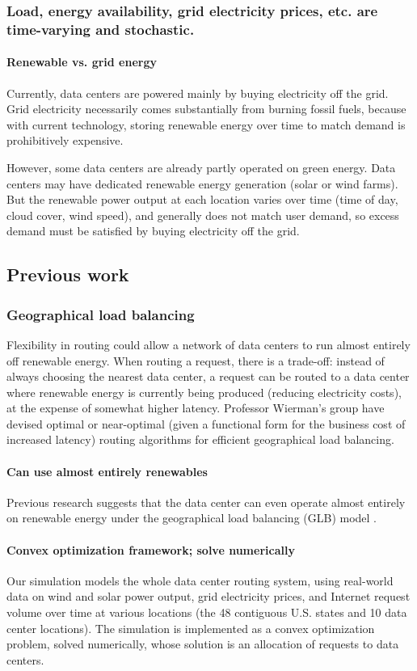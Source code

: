 \documentclass{acm_proc_article-sp}
\begin{document}
	\subsubsection{Load, energy availability, grid electricity prices, etc. are time-varying and stochastic.}
		\paragraph{Renewable vs. grid energy}
			Currently, data centers are powered mainly by buying electricity off the grid. Grid electricity necessarily comes substantially from burning fossil fuels, because with current technology, storing renewable energy over time to match demand is prohibitively expensive.
			
			However, some data centers are already partly operated on green energy. Data centers may have dedicated renewable energy generation (solar or wind farms). But the renewable power output at each location varies over time (time of day, cloud cover, wind speed), and generally does not match user demand, so excess demand must be satisfied by buying electricity off the grid.


\subsection{Previous work}
	\subsubsection{Geographical load balancing}
		Flexibility in routing could allow a network of data centers to run almost entirely off renewable energy. When routing a request, there is a trade-off: instead of always choosing the nearest data center, a request can be routed to a data center where renewable energy is currently being produced (reducing electricity costs), at the expense of somewhat higher latency. Professor Wierman’s group have devised optimal or near-optimal (given a functional form for the business cost of increased latency) routing algorithms for efficient geographical load balancing.
		\paragraph{Can use almost entirely renewables}
			Previous research suggests that the data center can even operate almost entirely on renewable energy under the geographical load balancing (GLB) model \cite{adam:GLB}.
		\paragraph{Convex optimization framework; solve numerically}
			Our simulation models the whole data center routing system, using real-world data on wind and solar power output, grid electricity prices, and Internet request volume over time at various locations (the 48 contiguous U.S. states and 10 data center locations). The simulation is implemented as a convex optimization problem, solved numerically, whose solution is an allocation of requests to data centers.
\end{document}
